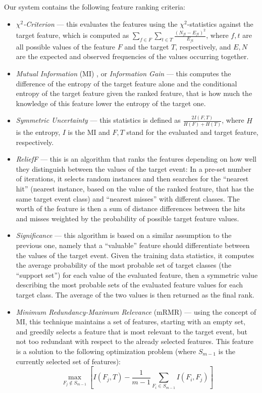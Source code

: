 \documentclass[12pt,notitlepage]{report}
\begin{document}
Our system contains the following feature ranking criteria:
\begin{itemize}
    \item \emph{$\chi^2$-Criterion} \citep[p. 255]{manning08} --- this evaluates the features using the $\chi^2$-statistics against the target feature, which is computed as $\sum_{f\in F}\sum_{t\in T}\frac{(N_{ft}-E_{ft})^2}{E_{ft}}$, where $f,t$ are all possible values of the feature $F$ and the target $T$, respectively, and $E,N$ are the expected and observed frequencies of the values occurring together.
    \item \emph{Mutual Information} (MI) \citep[p. 583]{manning00}, or \emph{Information Gain} \citep[p. 264]{manning08} --- this computes the difference of the entropy of the target feature alone and the conditional entropy of the target feature given the ranked feature, that is how much the knowledge of this feature lower the entropy of the target one.
    \item \emph{Symmetric Uncertainty} \citep[p. 291f.]{witten05} --- this statistics is defined as $\frac{2I(F,T)}{H(F) + H(T)}$, where $H$ is the entropy, $I$ is the MI and $F,T$ stand for the evaluated and target feature, respectively.
    \item \emph{ReliefF} \citep{kira92,kononenko94} --- this is an algorithm that ranks the features depending on how well they distinguish between the values of the target event: In a pre-set number of iterations, it selects random instances and then searches for the ``nearest hit'' (nearest instance, based on the value of the ranked feature, that has the same target event class) and ``nearest misses'' with different classes. The worth of the feature is then a sum of distance differences between the hits and misses weighted by the probability of possible target feature values.
    \item \emph{Significance} \citep{ahmad05} --- this algorithm is based on a similar assumption to the previous one, namely that a ``valuable'' feature should differentiate between the values of the target event. Given the training data statistics, it computes the average probability of the most probable set of target classes (the ``support set'') for each value  of the evaluated feature, then a symmetric value describing the most probable sets of the evaluated feature values for each target class. The average of the two values is then returned as the final rank.
    \item \emph{Minimum Redundancy-Maximum Relevance} (mRMR) \citep{peng05} --- using the concept of MI, this technique maintains a set of features, starting with an empty set, and greedily selects a feature that is most relevant to the target event, but not too redundant with respect to the already selected features. This feature is a solution to the following optimization problem (where $S_{m-1}$ is the currently selected set of features):
\begin{equation}
\max_{F_j\not\in S_{m-1}} \left[ I(F_j,T) - \frac{1}{m-1} \sum_{F_i\in S_{m-1}} I(F_i,F_j)\right]
\end{equation}
\end{itemize}
\end{document}
